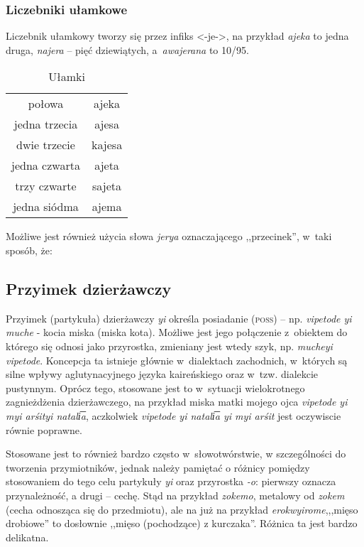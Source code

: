 \begin{spacing}{1.1}
\subsubsection{Liczebniki ułamkowe}

Liczebnik ułamkowy tworzy się przez infiks <-je->, na przykład \emph{ajeka} to
jedna druga, \emph{najera} -- pięć dziewiątych, a~\emph{awajerana} to 10/95.

\begin{table}[ht]
	\centering
	\caption{Ułamki}
	\begin{tabular}{cc} \toprule
		połowa & ajeka \\
		jedna trzecia & ajesa \\
		dwie trzecie & kajesa \\
		jedna czwarta & ajeta \\
		trzy czwarte & sajeta \\
		jedna siódma & ajema  \\\bottomrule
	\end{tabular}
	\label{tab:numerals4}
\end{table}

Możliwe jest również użycia słowa \emph{jerya} oznaczającego ,,przecinek'',
w~taki sposób, że:


\subsection{Przyimek dzierżawczy}

Przyimek (partykuła) dzierżawczy \emph{yi} określa posiadanie (\textsc{poss}) --
np. \emph{vipetode yi muche} - kocia miska (miska kota). Możliwe jest jego
połączenie z~obiektem do którego się odnosi jako przyrostka, zmieniany jest
wtedy szyk, np. \emph{mucheyi vipetode}. Koncepcja ta istnieje głównie
w~dialektach zachodnich, w~których są silne wpływy aglutynacyjnego języka
kaireńskiego oraz w~tzw. dialekcie pustynnym. Oprócz tego, stosowane jest to
w~sytuacji wielokrotnego zagnieżdżenia dzierżawczego, na przykład miska matki
mojego ojca \emph{vipetode yi myi arśityi natali͞a}, aczkolwiek \emph{vipetode
yi natali͞a yi myi arśit} jest oczywiscie równie poprawne. 

Stosowane jest to również bardzo często w~słowotwórstwie, w szczególności do
tworzenia przymiotników, jednak należy pamiętać o różnicy pomiędzy stosowaniem
do tego celu partykuły \emph{yi} oraz przyrostka \emph{-o}: pierwszy oznacza
przynależność, a drugi -- cechę. Stąd na przykład \emph{zokemo}, metalowy od
\emph{zokem} (cecha odnosząca się do przedmiotu), ale na już na przykład
\emph{erokwyirome},,,mięso drobiowe'' to dosłownie ,,mięso (pochodzące) z
kurczaka''. Różnica ta jest bardzo delikatna.


\end{spacing}
